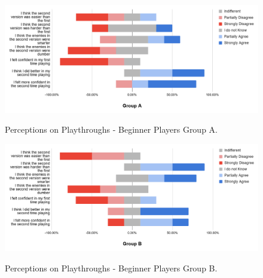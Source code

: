 \begin{figure}[!ht]
    \begin{center}
    \caption{Perceptions on Playthroughs - Beginner Players Group A.}
        \includegraphics[width=36em]{figures/fig-perception-versions-beginner-players-group-a.png}
        \label{fig:perception-playthrough-beginner-players-group-a}
    \end{center}
\end{figure}

\begin{figure}[!ht]
    \begin{center}
    \caption{Perceptions on Playthroughs - Beginner Players Group B.}
        \includegraphics[width=36em]{figures/fig-perception-versions-beginner-players-group-b.png}
        \label{fig:perception-playthrough-beginner-players-group-b}
    \end{center}
\end{figure}


